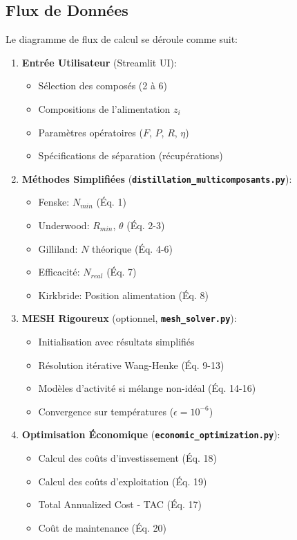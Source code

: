 \documentclass[11pt,a4paper]{article}
\newcommand{\file}[1]{\texttt{\textbf{#1}}}
\begin{document}
\subsection{Flux de Données}

Le diagramme de flux de calcul se déroule comme suit:

\begin{enumerate}[leftmargin=*]
    \item \textbf{Entrée Utilisateur} (Streamlit UI):
    \begin{itemize}
        \item Sélection des composés (2 à 6)
        \item Compositions de l'alimentation $z_i$
        \item Paramètres opératoires ($F$, $P$, $R$, $\eta$)
        \item Spécifications de séparation (récupérations)
    \end{itemize}

    \item \textbf{Méthodes Simplifiées} (\file{distillation\_multicomposants.py}):
    \begin{itemize}
        \item Fenske: $N_{min}$ (Éq. 1)
        \item Underwood: $R_{min}$, $\theta$ (Éq. 2-3)
        \item Gilliland: $N$ théorique (Éq. 4-6)
        \item Efficacité: $N_{real}$ (Éq. 7)
        \item Kirkbride: Position alimentation (Éq. 8)
    \end{itemize}

    \item \textbf{MESH Rigoureux} (optionnel, \file{mesh\_solver.py}):
    \begin{itemize}
        \item Initialisation avec résultats simplifiés
        \item Résolution itérative Wang-Henke (Éq. 9-13)
        \item Modèles d'activité si mélange non-idéal (Éq. 14-16)
        \item Convergence sur températures ($\epsilon = 10^{-6}$)
    \end{itemize}

    \item \textbf{Optimisation Économique} (\file{economic\_optimization.py}):
    \begin{itemize}
        \item Calcul des coûts d'investissement (Éq. 18)
        \item Calcul des coûts d'exploitation (Éq. 19)
        \item Total Annualized Cost - TAC (Éq. 17)
        \item Coût de maintenance (Éq. 20)
    \end{itemize}


\end{enumerate}
\end{document}
